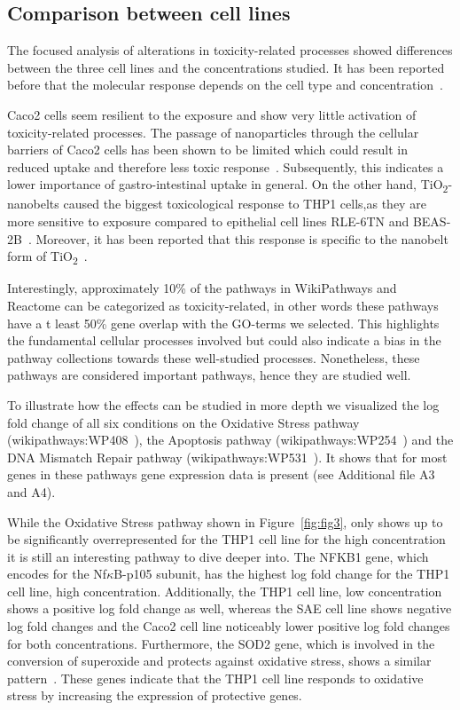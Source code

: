 \documentclass[ijms,article,submit,moreauthors,pdftex]{Definitions/mdpi}
\begin{document}
\subsection*{Comparison between cell lines}
The focused analysis of alterations in toxicity-related processes showed differences between the three cell lines and the concentrations studied. It has been reported before that the molecular response depends on the cell type and concentration~\cite{TadaOikawa2016}. 

Caco2 cells seem resilient to the exposure and show very little activation of toxicity-related processes. The passage of nanoparticles through the cellular barriers of Caco2 cells has been shown to be limited which could result in reduced uptake and therefore less toxic response~\cite{Ye2017}. Subsequently, this indicates a lower importance of gastro-intestinal uptake in general. On the other hand, TiO\textsubscript{2}-nanobelts caused the biggest toxicological response to THP1 cells,as they are more sensitive to exposure compared to epithelial cell lines RLE-6TN and BEAS-2B~\cite{Xia2013}. Moreover, it has been reported that this response is specific to the nanobelt form of TiO\textsubscript{2}~\cite{Xia2013}.

Interestingly, approximately 10\% of the pathways in WikiPathways and Reactome can be categorized as toxicity-related, in other words these pathways have a t least 50\% gene overlap with the GO-terms we selected. This highlights the fundamental cellular processes involved but could also indicate a bias in the pathway collections towards these well-studied processes. Nonetheless, these pathways are considered important pathways, hence they are studied well.  

To illustrate how the effects can be studied in more depth we visualized the log fold change of all six conditions on the Oxidative Stress pathway (wikipathways:WP408~\cite{WP408}), the Apoptosis pathway (wikipathways:WP254~\cite{WP254}) and the DNA Mismatch Repair pathway (wikipathways:WP531~\cite{WP531}). It shows that for most genes in these pathways gene expression data is present (see Additional file A3 and A4). 

While the Oxidative Stress pathway shown in Figure~\ref{fig:fig3}, only shows up to be significantly overrepresented for the THP1 cell line for the high concentration it is still an interesting pathway to dive deeper into. The NFKB1 gene, which encodes for the Nf$\kappa$B-p105 subunit, has the highest log fold change for the THP1 cell line, high concentration. Additionally, the THP1 cell line, low concentration shows a positive log fold change as well, whereas the SAE cell line shows negative log fold changes and the Caco2 cell line noticeably lower positive log fold changes for both concentrations. Furthermore, the SOD2 gene, which is involved in the conversion of superoxide and protects against oxidative stress, shows a similar pattern~\cite{Urso2003}. These genes indicate that the THP1 cell line responds to oxidative stress by increasing the expression of protective genes. 
\end{document}
